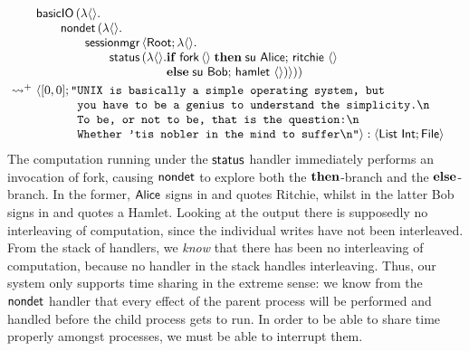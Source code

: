 \documentclass[12pt,phd,lfcs,twoside,openright,logo,leftchapter,normalheadings]{infthesis}
\theoremstyle{plain}
\theoremstyle{definition}
\begin{document}
\[
  \ba{@{~}l@{~}l}
    &\bl
    \basicIO\,(\lambda\Unit.\\
         \qquad\nondet\,(\lambda\Unit.\\
           \qquad\qquad\sessionmgr\,\Record{\Root;\lambda\Unit.\\
             \qquad\qquad\qquad\status\,(\lambda\Unit.
                 \ba[t]{@{}l}
                   \If\;\fork\,\Unit\;\Then\;
                       \su~\Alice;\,
                       \quoteRitchie~\Unit\\
                   \Else\;
                       \su~\Bob;\,
                       \quoteHamlet~\Unit)}))
                 \ea
     \el \smallskip\\
     \reducesto^+&
     \Record{
       \ba[t]{@{}l}
         [0, 0];
         \texttt{"}\ba[t]{@{}l}
           \texttt{UNIX is basically a simple operating system, but }\\
           \texttt{you have to be a genius to understand the simplicity.\nl}\\
           \texttt{To be, or not to be, that is the question:\nl}\\
           \texttt{Whether 'tis nobler in the mind to suffer\nl"}} : \Record{\List~\Int; \UFile}
         \ea
       \ea
  \ea
\]
%
The computation running under the $\mathsf{status}$ handler immediately
performs an invocation of fork, causing $\mathsf{nondet}$ to explore both the
$\mathbf{then}$-branch and the $\mathbf{else}$-branch. In the former, $\mathsf{Alice}$ signs
in and quotes Ritchie, whilst in the latter Bob signs in and quotes a
Hamlet.
%
Looking at the output there is supposedly no interleaving of
computation, since the individual writes have not been
interleaved. From the stack of handlers, we \emph{know} that there has
been no interleaving of computation, because no handler in the stack
handles interleaving. Thus, our system only supports time sharing in
the extreme sense: we know from the $\mathsf{nondet}$ handler that every
effect of the parent process will be performed and handled before the
child process gets to run. In order to be able to share time properly
amongst processes, we must be able to interrupt them.
\end{document}
